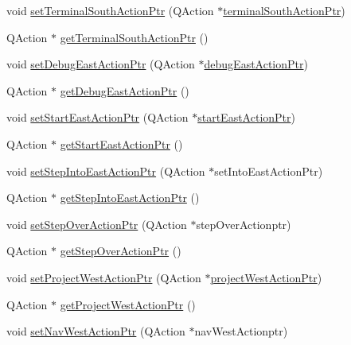 \begin{DoxyCompactItemize}
void \hyperlink{class_master_actions_a718fd78374dab2c701fef75aa9e7a2fe}{set\-Terminal\-South\-Action\-Ptr} (Q\-Action $\ast$\hyperlink{class_master_actions_ad96c9f17230e162e9a9f39a867101a53}{terminal\-South\-Action\-Ptr})
\item 
Q\-Action $\ast$ \hyperlink{class_master_actions_ae9a9fe05579b18051c29f7e54d50a06b}{get\-Terminal\-South\-Action\-Ptr} ()
\item 
void \hyperlink{class_master_actions_a363cc332bbc67c3f719d2f861a7cce91}{set\-Debug\-East\-Action\-Ptr} (Q\-Action $\ast$\hyperlink{class_master_actions_ab26f3e610cb9e303ac3a987964dfac19}{debug\-East\-Action\-Ptr})
\item 
Q\-Action $\ast$ \hyperlink{class_master_actions_ab0bf5679a95bb077993d8461de4ae1e5}{get\-Debug\-East\-Action\-Ptr} ()
\item 
void \hyperlink{class_master_actions_aa382a54f4579ea07235caf0c9c1fc45a}{set\-Start\-East\-Action\-Ptr} (Q\-Action $\ast$\hyperlink{class_master_actions_a8ea0090704403ea15decad4e0104feb8}{start\-East\-Action\-Ptr})
\item 
Q\-Action $\ast$ \hyperlink{class_master_actions_a7f0344eed03af4f55f63f8ec7bf8e22c}{get\-Start\-East\-Action\-Ptr} ()
\item 
void \hyperlink{class_master_actions_a9e7a8664b900eaa0fa9bda8c7bbe1ca7}{set\-Step\-Into\-East\-Action\-Ptr} (Q\-Action $\ast$set\-Into\-East\-Action\-Ptr)
\item 
Q\-Action $\ast$ \hyperlink{class_master_actions_a952ffb933b8f8e1c8378eaea85ebe9ad}{get\-Step\-Into\-East\-Action\-Ptr} ()
\item 
void \hyperlink{class_master_actions_abafef11e65574a8861a3ff770c78d18f}{set\-Step\-Over\-Action\-Ptr} (Q\-Action $\ast$step\-Over\-Actionptr)
\item 
Q\-Action $\ast$ \hyperlink{class_master_actions_aa042cf65b6c9ab5f056c829ca76de95d}{get\-Step\-Over\-Action\-Ptr} ()
\item 
void \hyperlink{class_master_actions_ad0522fc89be3dd4451d84300208b5925}{set\-Project\-West\-Action\-Ptr} (Q\-Action $\ast$\hyperlink{class_master_actions_aa4160469d2e9a840448c49e95bcfa9e5}{project\-West\-Action\-Ptr})
\item 
Q\-Action $\ast$ \hyperlink{class_master_actions_a97e9c1a3bd46f70d1afd640ac06cc18d}{get\-Project\-West\-Action\-Ptr} ()
\item 
void \hyperlink{class_master_actions_a1aa6a146182e129eb5da1be4cc11fa1b}{set\-Nav\-West\-Action\-Ptr} (Q\-Action $\ast$nav\-West\-Actionptr)
\item 

\end{DoxyCompactItemize}

